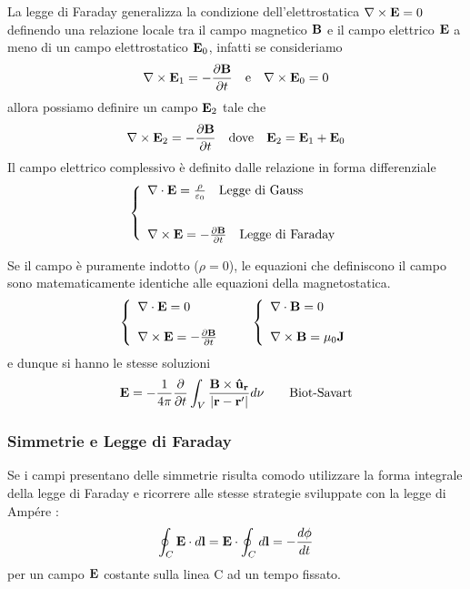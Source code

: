 La legge di Faraday generalizza la  condizione dell'elettrostatica  $\nabla \times \bold{E} = 0$ definendo una relazione locale tra il campo magnetico $\bold{B}$ e il campo elettrico $\bold{E}$ a meno di un campo elettrostatico $\bold{E}_0$, infatti se consideriamo 
\begin{align*}
	\nabla \times \bold{E}_1 = - \frac{\partial \bold{B}}{\partial t} \quad \text{e} \quad \nabla \times \bold{E}_0 = 0
\end{align*}
allora possiamo definire un campo $\bold{E}_2$ tale che 
\begin{equation*}
	\nabla \times \bold{E}_2 = - \frac{\partial \bold{B}}{\partial t} \quad \text{dove} \quad \bold{E}_2 = \bold{E}_1 + \bold{E}_0
\end{equation*}
Il campo elettrico complessivo \`e definito dalle relazione in forma differenziale 
\begin{align*}
	\left \{ \begin{array}{l}
		\nabla \cdot \bold{E} = \frac{\rho}{\varepsilon_0} \quad \text{Legge di Gauss} \\ \rule{0pt}{30pt}
		\nabla \times \bold{E} = - \frac{\partial \bold{B}}{\partial t} \quad \text{Legge di Faraday}
	\end{array}\right.
\end{align*}

Se il campo \`e puramente indotto ($\rho = 0$), le equazioni che definiscono il campo sono matematicamente identiche alle equazioni della magnetostatica.
\begin{align*}
	\left \{ \begin{array}{l}
	\nabla \cdot \bold{E} = 0 \\ \rule{0pt}{20pt} 
	\nabla \times \bold{E} = - \frac{\partial \bold{B}}{\partial t}		
	\end{array}\right.
	\quad \quad  
	\left \{ \begin{array}{l}
	\nabla \cdot \bold{B} = 0 \\ \rule{0pt}{20pt} 
	\nabla \times \bold{B} = \mu_0 \bold{J}		
	\end{array}\right.
\end{align*}
e dunque si hanno le stesse soluzioni 
\begin{equation*}
	\bold{E} = - \frac{1}{4 \pi } \frac{\partial}{\partial t} \int_{V} \frac{\bold{B} \times \bold{\hat{u}_r}}{|\bold{r} - \bold{r}'|}d \nu \quad \quad \text{Biot-Savart}
\end{equation*}

\subsubsection{Simmetrie e Legge di Faraday}
Se i campi presentano delle simmetrie risulta comodo utilizzare la forma integrale della legge di Faraday e ricorrere alle stesse strategie sviluppate con la legge di Amp\'ere :
\begin{equation*}
	\oint_{C} \bold{E} \cdot d\bold{l} = \bold{E} \cdot \oint_{C}d\bold{l} = - \frac{d \phi}{dt}
\end{equation*}
per un campo $\bold{E}$ costante sulla linea C ad un tempo fissato.
